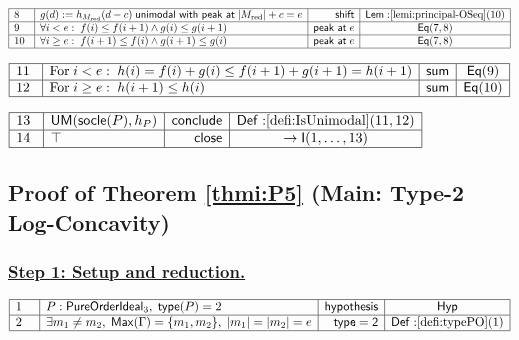\documentclass[11pt,reqno]{amsart}
\begin{document}
\nointerlineskip\noindent$%
\begin{array}{|m{0.5cm}|l|r|c|}
\hline
8 & g(d):=h_{M_{\mathrm{red}}}(d-c)\;\mathsf{unimodal\ with\ peak\ at}\;|M_{%
\mathrm{red}}|+c=e & \mathsf{shift} & \mathsf{Lem:}\ref{lemi:principal-OSeq}%
(10) \\ \hline
9 & \forall i<e:\;f(i)\le f(i+1)\wedge g(i)\le g(i+1) & \mathsf{peak\ at}\;e
& \mathsf{Eq}(7,8) \\ \hline
10 & \forall i\ge e:\;f(i+1)\le f(i)\wedge g(i+1)\le g(i) & \mathsf{peak\ at}%
\;e & \mathsf{Eq}(7,8) \\ \hline
\end{array}%
$

\nointerlineskip\noindent$%
\begin{array}{|m{0.5cm}|l|r|c|}
\hline
11 & \text{For}\;i<e:\;h(i)=f(i)+g(i)\le f(i+1)+g(i+1)=h(i+1) & \mathsf{sum}
& \mathsf{Eq}(9) \\ \hline
12 & \text{For}\;i\ge e:\;h(i+1)\le h(i) & \mathsf{sum} & \mathsf{Eq}(10) \\ 
\hline
\end{array}%
$

\nointerlineskip\noindent$%
\begin{array}{|m{0.5cm}|l|r|c|}
\hline
13 & \mathsf{UM}(\mathsf{socle}(P),h_{P}) & \mathsf{conclude} & \mathsf{Def:}%
\ref{defi:IsUnimodal}(11,12) \\ \hline
14 & \top & \mathsf{close} & \to\mathsf{I}(1,\dots,13) \\ \hline
\end{array}%
$

\medskip

\subsection*{Proof of Theorem \protect\ref{thmi:P5} (Main: Type-2
Log-Concavity)}

\subsubsection*{\protect\underline{Step 1: Setup and reduction.}}

\noindent$%
\begin{array}{|m{0.5cm}|l|r|c|}
\hline
1 & P:\mathsf{PureOrderIdeal}_{3},\;\mathsf{type}(P)=2 & \mathsf{hypothesis}
& \mathsf{Hyp} \\ \hline
2 & \exists m_{1}\ne m_{2},\;\mathsf{Max}(\Gamma)=\{m_{1},m_{2}\},%
\;|m_{1}|=|m_{2}|=e & \mathsf{type=2} & \mathsf{Def:}\ref{defi:typePO}(1) \\ 
\hline
\end{array}%
$
\end{document}
